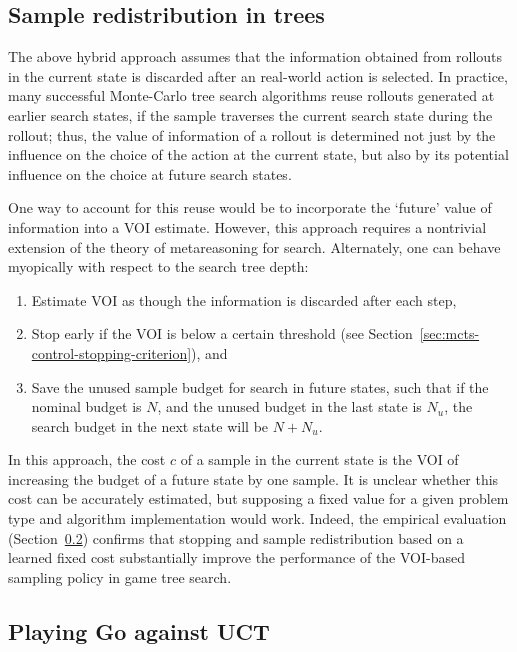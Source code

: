 \subsection{Sample redistribution in trees}
\label{sec:mcts-control-redistribution}

The above hybrid approach assumes
that the information obtained from rollouts in the
current state is discarded after an real-world action is selected. In practice,
many successful Monte-Carlo tree search algorithms reuse rollouts
generated at earlier search states, if the sample traverses the
current search state during the rollout; thus, the value of information of a rollout is
determined not just by the influence on the choice of the action at
the current state, but also by its potential influence on the choice at future
search states.

One way to account for this reuse would be to incorporate the
`future' value of information into a VOI estimate. However, this 
approach requires a nontrivial extension of the theory of metareasoning for search.
Alternately, one can behave myopically with respect to the search tree depth:
\begin{enumerate}
\item Estimate VOI as though the information is discarded after each step,
\item Stop early if the VOI is below a certain threshold
   (see Section~\ref{sec:mcts-control-stopping-criterion}), and
\item Save the unused sample budget for search in future states, such that
   if the nominal budget is $N$, and the unused budget in the last state
   is $N_u$, the search budget in the next state will be $N+N_u$.
\end{enumerate}
In this approach, the cost $c$ of a sample in the current state is the
VOI of increasing the budget of a future state by one sample.  It is
unclear whether this cost can be accurately estimated, but supposing
a fixed value for a given problem type and algorithm implementation
would work. Indeed, the empirical evaluation (Section~\ref{sec:mcts-emp-go})
confirms that stopping and sample redistribution based on a learned
fixed cost  substantially improve the performance of the VOI-based
sampling policy in game tree search.


\subsection{Playing Go against UCT}
\label{sec:mcts-emp-go}

